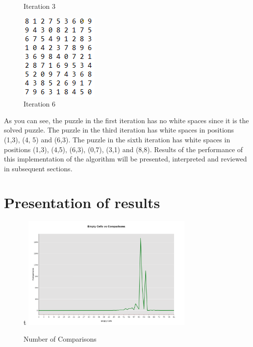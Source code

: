 \documentclass{article}
\begin{document}
\begin{figure}[!htb]
      \caption{Iteration 3}\label{fig:awesome_image2}
    \endminipage\hfill
      \includegraphics[width=\linewidth]{iteration3.png}
      \caption{Iteration 6}\label{fig:awesome_image3}
    \endminipage
    \end{figure}


    As you can see, the puzzle in the first iteration has no white spaces since it is the solved puzzle. The puzzle in the third iteration has white spaces in positions (1,3), (4, 5) and (6,3). The puzzle in the sixth iteration has white spaces in positions (1,3), (4,5), (6,3), (0,7), (3,1) and (8,8). Results of the performance of this implementation of the algorithm will be presented, interpreted and reviewed in subsequent sections.
     
    \pagebreak 
    \section{Presentation of results}
    \begin{figure}[h]t
        \centering
        \includegraphics[width=0.75\textwidth]{Comparisons.png}
        \caption{Number of Comparisons}
    \end{figure}
    
\end{document}
